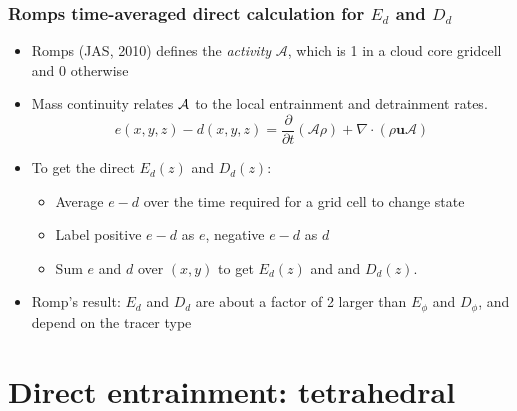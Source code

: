 \documentclass[fleqn,hyperref={colorlinks=true,linkcolor=blue,urlcolor=blue},numbers]{beamer}
\begin{document}
\begin{frame}
  \frametitle{Romps time-averaged direct calculation for $E_d$ and $D_d$}

  \begin{itemize}
  \item Romps (JAS, 2010) defines the \textit{activity} $\mathcal{A}$, which is 1 in a cloud core gridcell
and 0 otherwise \pause
  \item Mass continuity relates ${\cal{A}}$ to the local entrainment and detrainment rates.
\begin{equation*}
  \label{eq:romps_e_minus_d}
  e(x,y,z) - d(x,y,z) = \frac{\partial}{\partial t}(\mathcal{A}\rho) 
        + \nabla \cdot (\rho \mathbf{u} \mathcal{A}) 
\end{equation*}

\pause
\item To get the direct $E_d(z)$ and $D_d(z)$:

  \begin{itemize}
  \item Average $e - d$ over the time required for a grid cell to change state
  \item Label positive  $e-d$  as $e$, negative $e-d$ as  $d$
  \item Sum $e$ and $d$ over $(x,y)$ to get  $E_d(z)$ and and $D_d(z)$.
  \end{itemize} \pause


\item Romp's result:  $E_d$ and $D_d$ are about a factor of 2 larger than
$E_\phi$ and $D_\phi$, and depend on the tracer type

  \end{itemize}


\end{frame}

\section{Direct entrainment: tetrahedral}
\label{sec:direct-entr-tetr}
\end{document}

